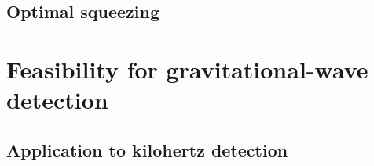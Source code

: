 
\subsection{Optimal squeezing}


\section{Feasibility for gravitational-wave detection}







\subsection{Application to kilohertz detection}

